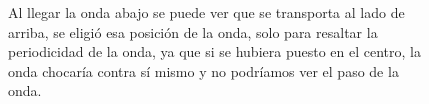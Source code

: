\documentclass[12pt,a4paper]{book}
\begin{document}
\begin{figure}[H]
\centering
{}
\caption{Al llegar la onda abajo se puede ver que se transporta al lado de arriba, se eligió esa posición de la onda, solo para resaltar la periodicidad de la onda, ya que si se hubiera puesto en el centro, 
la onda chocaría contra sí mismo y no podríamos ver el paso de la onda.} \label{fig:periodicas}
\end{figure}
\end{document}
